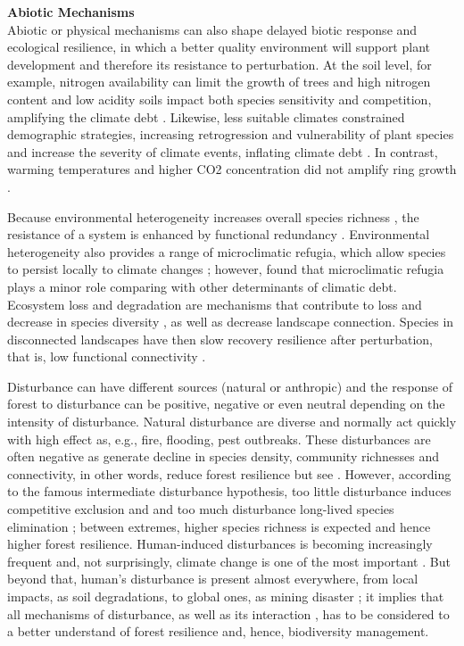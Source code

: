 \textbf{Abiotic Mechanisms}\\
Abiotic or physical mechanisms can also shape delayed biotic response and ecological resilience, in which a better quality environment will support plant development and therefore its resistance to perturbation.
At the soil level, for example, nitrogen availability can limit the growth of trees \parencite{Sullivan2013} and high nitrogen content and low acidity soils impact both species sensitivity and competition, amplifying the climate debt \parencite{Bertrand2016}.
Likewise, less suitable climates constrained demographic strategies, increasing retrogression and vulnerability of plant species \parencite{Csergo2017} and increase the severity of climate events, inflating climate debt \parencite{Bertrand2016}.
In contrast, warming temperatures and higher CO2 concentration did not amplify ring growth \parencite{Girardin2017}.

Because environmental heterogeneity increases overall species richness \parencite{Stein2014}, the resistance of a system is enhanced by functional redundancy \parencite{Oliver2015}.
Environmental heterogeneity also provides a range of microclimatic refugia, which allow species to persist locally to climate changes \parencite{Maclean2015}; however, \textcite{Bertrand2016} found that microclimatic refugia plays a minor role comparing with other determinants of climatic debt.
Ecosystem loss and degradation are mechanisms that contribute to loss and decrease in species diversity \parencite{Essl2015}, as well as decrease landscape connection.
Species in disconnected landscapes have then slow recovery resilience after perturbation, that is, low functional connectivity \parencite{Oliver2015}.

Disturbance can have different sources (natural or anthropic) and the response of forest to disturbance can be positive, negative or even neutral depending on the intensity of disturbance.
Natural disturbance are diverse and normally act quickly with high effect as, e.g., fire, flooding, pest outbreaks.
These disturbances are often negative as generate decline in species density, community richnesses and connectivity, in other words, reduce forest resilience \parencite{Buma2011,Essl2015} but see \textcite{Bertrand2016}.
However, according to the famous intermediate disturbance hypothesis, too little disturbance induces competitive exclusion and and too much disturbance long-lived species elimination \parencite{Grime1973,Horn1975,Connell1978}; between extremes, higher species richness is expected and hence higher forest resilience.
Human-induced disturbances is becoming increasingly frequent and, not surprisingly, climate change is one of the most important \parencite{Bellard2012}.
But beyond that, human's disturbance is present almost everywhere, from local impacts, as soil degradations, to global ones, as mining disaster \parencite{Garcia2017}; it implies that all mechanisms of disturbance, as well as its interaction \parencite{Goring2017}, has to be considered to a better understand of forest resilience and, hence, biodiversity management.

